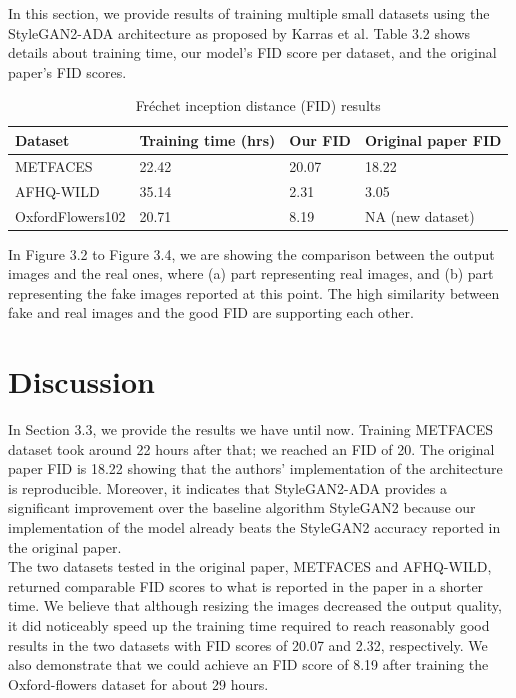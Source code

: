 \documentclass{report}
\begin{document}
In this section, we provide results of training multiple small datasets using the StyleGAN2-ADA architecture as proposed by Karras et al. Table 3.2 shows details about training time, our model's FID score per dataset, and the original paper's FID scores. 


\begin{table}[!ht]
\caption{Fréchet inception distance (FID) results}
\centering 
\begin{tabular}{ |p{3cm}|p{3cm}|p{1.5cm}|p{3cm}| }
 \hline
 Dataset & Training time (hrs) & Our FID & Original paper FID\\
 \hline
 METFACES        & 22.42    & 20.07 & 18.22\\
 AFHQ-WILD       & 35.14    & 2.31 & 3.05\\
 OxfordFlowers102& 20.71    & 8.19 & NA (new dataset)\\
 \hline
\end{tabular}
\end{table}
In Figure 3.2 to Figure 3.4, we are showing the comparison between the output images and the real ones, where (a) part representing real images, and (b) part representing the fake images reported at this point. The high similarity between fake and real images and the good FID are supporting each other.



\section{Discussion}


In Section 3.3, we provide the results we have until now. Training METFACES dataset took around 22 hours after that; we reached an FID of 20. The original paper FID is 18.22 showing that the authors' implementation of the architecture is reproducible. Moreover, it indicates that StyleGAN2-ADA provides a significant improvement over the baseline algorithm StyleGAN2 because our implementation of the model already beats the StyleGAN2 accuracy reported in the original paper.\\
The two datasets tested in the original paper, METFACES and AFHQ-WILD, returned comparable FID scores to what is reported in the paper in a shorter time.  We believe that although resizing the images decreased the output quality, it did noticeably speed up the training time required to reach reasonably good results in the two datasets with FID scores of 20.07 and 2.32, respectively. We also demonstrate that we could achieve an FID score of 8.19 after training the Oxford-flowers dataset for about 29 hours.
\end{document}
